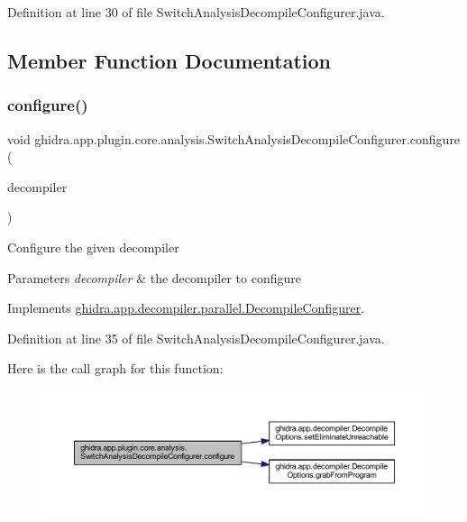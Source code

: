 Definition at line 30 of file Switch\+Analysis\+Decompile\+Configurer.\+java.



\subsection{Member Function Documentation}
\mbox{\label{classghidra_1_1app_1_1plugin_1_1core_1_1analysis_1_1_switch_analysis_decompile_configurer_a3691560a6f568eee4a060f0e2656410f}} 
\subsubsection{\texorpdfstring{configure()}{configure()}}
{\footnotesize\ttfamily void ghidra.\+app.\+plugin.\+core.\+analysis.\+Switch\+Analysis\+Decompile\+Configurer.\+configure (\begin{DoxyParamCaption}\item[{\mbox{\hyperlink{classghidra_1_1app_1_1decompiler_1_1_decomp_interface}{Decomp\+Interface}}}]{decompiler }\end{DoxyParamCaption})\hspace{0.3cm}{\ttfamily [inline]}}

Configure the given decompiler


\begin{DoxyParams}{Parameters}
{\em decompiler} & the decompiler to configure \\
\hline
\end{DoxyParams}


Implements \mbox{\hyperlink{interfaceghidra_1_1app_1_1decompiler_1_1parallel_1_1_decompile_configurer_a168fbd0001569c08cc1008e0b22c8f68}{ghidra.\+app.\+decompiler.\+parallel.\+Decompile\+Configurer}}.



Definition at line 35 of file Switch\+Analysis\+Decompile\+Configurer.\+java.

Here is the call graph for this function\+:
\nopagebreak
\begin{figure}[H]
\begin{center}
\leavevmode
\includegraphics[width=350pt]{classghidra_1_1app_1_1plugin_1_1core_1_1analysis_1_1_switch_analysis_decompile_configurer_a3691560a6f568eee4a060f0e2656410f_cgraph}
\end{center}
\end{figure}


